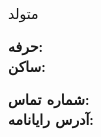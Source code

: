 \documentclass{./../lib/resume}
\begin{document}
\iftoggle{Dev}{\par}{}
\parbox{37mm}
{\parbox{37mm}{\raggedleft\Huge\bfseries\color{cyan}\fullName}\\\parbox{33mm}{\centering متولد \bornData}}\quad\quad\parbox{68mm}
{\textbf{حرفه:} \ProfessionI\\\textbf{ساکن:} \fullAddress}\quad\parbox{76mm}
{\textbf{شماره تماس:} \mobilePhoneI\\\textbf{آدرس رایانامه:} \emailI}

\descriptions

\craft

\workExperience

\teaching

\project

\education

\publication

\LicensesCertifications

\honorsAwards

\training
\end{document}
